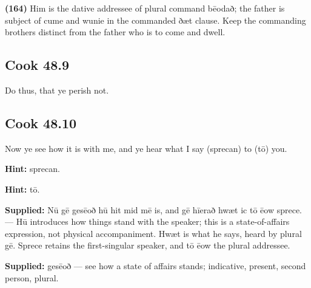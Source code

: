 \textbf{(164)} Him is the dative addressee of plural command bēodað; the father is subject of cume and wunie in the commanded ðæt clause. Keep the commanding brothers distinct from the father who is to come and dwell.

\par\begin{minipage}{\linewidth}\raggedright
\subsection*{Cook 48.9}

Do thus, that ye perish not.

\end{minipage}\par\addvspace{4pt}

\par\begin{minipage}{\linewidth}\raggedright
\subsection*{Cook 48.10}

Now ye see how it is with me, and ye hear what I say (sprecan) to (tō) you.

\textbf{Hint:} sprecan.

\textbf{Hint:} tō.

\end{minipage}\par\addvspace{4pt}

\textbf{Supplied:} Nū gē gesēoð hū hit mid mē is, and gē hīerað hwæt ic tō ēow sprece. — Hū introduces how things stand with the speaker; this is a state-of-affairs expression, not physical accompaniment. Hwæt is what he says, heard by plural gē. Sprece retains the first-singular speaker, and tō ēow the plural addressee.

\textbf{Supplied:} gesēoð — see how a state of affairs stands; indicative, present, second person, plural.

